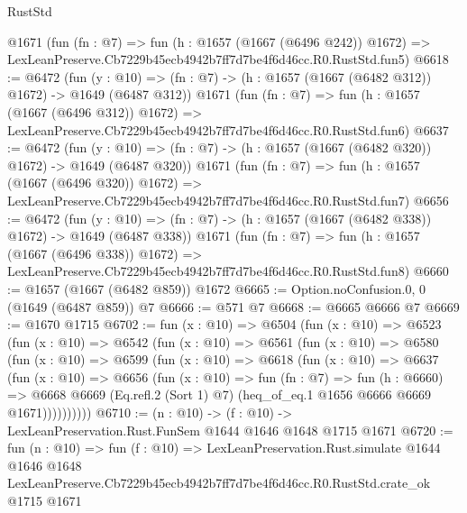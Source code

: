 \begin{lexlean}{RustStd}
\begin{coremodule}
    @1671
    (fun (fn : @7) =>
    fun (h : @1657 (@1667 (@6496 @242)) @1672) =>
    LexLeanPreserve.Cb7229b45ecb4942b7ff7d7be4f6d46cc.R0.RustStd.fun5)
@6618 := @6472
    (fun (y : @10) => (fn : @7) -> (h : @1657 (@1667 (@6482 @312)) @1672) -> @1649 (@6487 @312))
    @1671
    (fun (fn : @7) =>
    fun (h : @1657 (@1667 (@6496 @312)) @1672) =>
    LexLeanPreserve.Cb7229b45ecb4942b7ff7d7be4f6d46cc.R0.RustStd.fun6)
@6637 := @6472
    (fun (y : @10) => (fn : @7) -> (h : @1657 (@1667 (@6482 @320)) @1672) -> @1649 (@6487 @320))
    @1671
    (fun (fn : @7) =>
    fun (h : @1657 (@1667 (@6496 @320)) @1672) =>
    LexLeanPreserve.Cb7229b45ecb4942b7ff7d7be4f6d46cc.R0.RustStd.fun7)
@6656 := @6472
    (fun (y : @10) => (fn : @7) -> (h : @1657 (@1667 (@6482 @338)) @1672) -> @1649 (@6487 @338))
    @1671
    (fun (fn : @7) =>
    fun (h : @1657 (@1667 (@6496 @338)) @1672) =>
    LexLeanPreserve.Cb7229b45ecb4942b7ff7d7be4f6d46cc.R0.RustStd.fun8)
@6660 := @1657 (@1667 (@6482 @859)) @1672
@6665 := Option.noConfusion.{0, 0} (@1649 (@6487 @859)) @7
@6666 := @571 @7
@6668 := @6665 @6666 @7
@6669 := @1670 @1715
@6702 := fun (x : @10) =>
  @6504
    (fun (x : @10) =>
    @6523
      (fun (x : @10) =>
      @6542
        (fun (x : @10) =>
        @6561
          (fun (x : @10) =>
          @6580
            (fun (x : @10) =>
            @6599
              (fun (x : @10) =>
              @6618
                (fun (x : @10) =>
                @6637
                  (fun (x : @10) =>
                  @6656
                    (fun (x : @10) =>
                    fun (fn : @7) =>
                    fun (h : @6660) =>
                    @6668
                      @6669
                      (Eq.refl.{2} (Sort 1) @7)
                      (heq_of_eq.{1} @1656 @6666 @6669 @1671))))))))))
@6710 := (n : @10) -> (f : @10) -> LexLeanPreservation.Rust.FunSem @1644 @1646 @1648 @1715 @1671
@6720 := fun (n : @10) =>
  fun (f : @10) =>
  LexLeanPreservation.Rust.simulate
    @1644
    @1646
    @1648
    LexLeanPreserve.Cb7229b45ecb4942b7ff7d7be4f6d46cc.R0.RustStd.crate_ok
    @1715
    @1671
\end{coremodule}
\end{lexlean}
